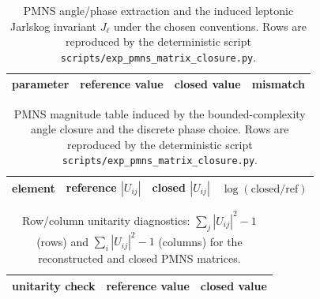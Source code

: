 \begin{table}[t]
\centering
\small
\setlength{\tabcolsep}{6pt}
\renewcommand{\arraystretch}{1.15}
\begin{tabular}{lrrr}
\toprule
parameter & reference value & closed value & mismatch \\
\midrule
%
\end{tabular}
\caption{PMNS angle/phase extraction and the induced leptonic Jarlskog invariant $J_\ell$ under the chosen conventions. Rows are reproduced by the deterministic script \texttt{scripts/exp\_pmns\_matrix\_closure.py}.}
\label{tab:pmns_angles}
\end{table}

\begin{table}[t]
\centering
\small
\setlength{\tabcolsep}{6pt}
\renewcommand{\arraystretch}{1.15}
\begin{tabular}{lrrr}
\toprule
element & reference $|U_{ij}|$ & closed $|U_{ij}|$ & $\log(\mathrm{closed}/\mathrm{ref})$ \\
\midrule
%
\end{tabular}
\caption{PMNS magnitude table induced by the bounded-complexity angle closure and the discrete phase choice. Rows are reproduced by the deterministic script \texttt{scripts/exp\_pmns\_matrix\_closure.py}.}
\label{tab:pmns_matrix}
\end{table}

\begin{table}[t]
\centering
\small
\setlength{\tabcolsep}{10pt}
\renewcommand{\arraystretch}{1.15}
\begin{tabular}{lrr}
\toprule
unitarity check & reference value & closed value \\
\midrule
%
\end{tabular}
\caption{Row/column unitarity diagnostics: $\sum_j |U_{ij}|^2-1$ (rows) and $\sum_i |U_{ij}|^2-1$ (columns) for the reconstructed and closed PMNS matrices.}
\label{tab:pmns_unitarity}
\end{table}

